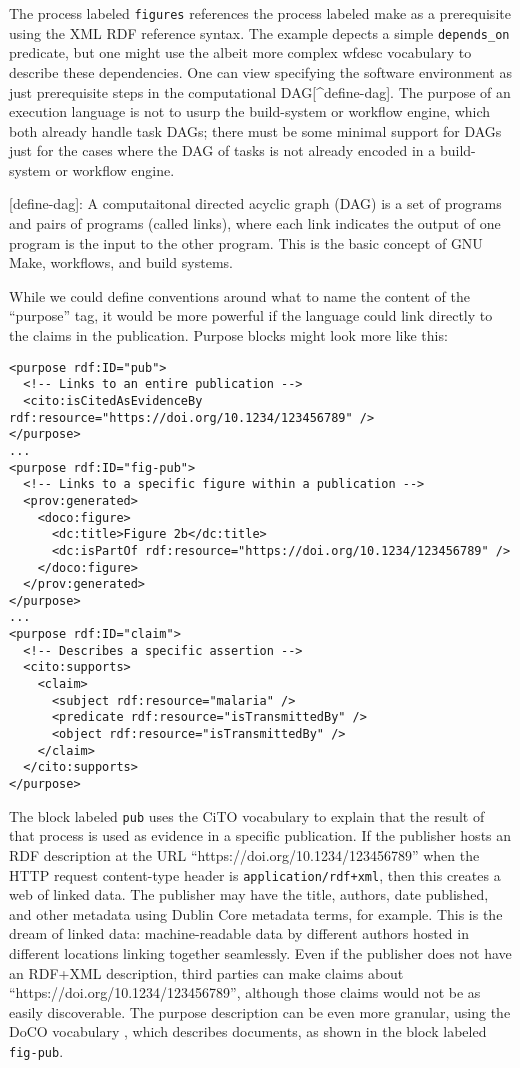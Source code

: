 \documentclass[manuscript,authordraft]{acmart}
\begin{document}
\normalsize

The process labeled \texttt{figures} references the process labeled make
as a prerequisite using the XML RDF reference syntax. The example
depects a simple \texttt{depends\_on} predicate, but one might use the
albeit more complex wfdesc vocabulary to describe these dependencies.
One can view specifying the software environment as just prerequisite
steps in the computational DAG{[}\^{}define-dag{]}. The purpose of an
execution language is not to usurp the build-system or workflow engine,
which both already handle task DAGs; there must be some minimal support
for DAGs just for the cases where the DAG of tasks is not already
encoded in a build-system or workflow engine.

{[}define-dag{]}: A computaitonal directed acyclic graph (DAG) is a set
of programs and pairs of programs (called links), where each link
indicates the output of one program is the input to the other program.
This is the basic concept of GNU Make, workflows, and build systems.

While we could define conventions around what to name the content of the
``purpose'' tag, it would be more powerful if the language could link
directly to the claims in the publication. Purpose blocks might look
more like this:

\small

\begin{verbatim}
<purpose rdf:ID="pub">
  <!-- Links to an entire publication -->
  <cito:isCitedAsEvidenceBy rdf:resource="https://doi.org/10.1234/123456789" />
</purpose>
...
<purpose rdf:ID="fig-pub">
  <!-- Links to a specific figure within a publication -->
  <prov:generated>
    <doco:figure>
      <dc:title>Figure 2b</dc:title>
      <dc:isPartOf rdf:resource="https://doi.org/10.1234/123456789" />
    </doco:figure>
  </prov:generated>
</purpose>
...
<purpose rdf:ID="claim">
  <!-- Describes a specific assertion -->
  <cito:supports>
    <claim>
      <subject rdf:resource="malaria" />
      <predicate rdf:resource="isTransmittedBy" />
      <object rdf:resource="isTransmittedBy" />
    </claim>
  </cito:supports>
</purpose>
\end{verbatim}

\normalsize

The block labeled \texttt{pub} uses the CiTO vocabulary
\cite{shotton_cito_2010} to explain that the result of that process is
used as evidence in a specific publication. If the publisher hosts an
RDF description at the URL ``https://doi.org/10.1234/123456789'' when
the HTTP request content-type header is \texttt{application/rdf+xml},
then this creates a web of linked data. The publisher may have the
title, authors, date published, and other metadata using Dublin Core
metadata terms, for example. This is the dream of linked data:
machine-readable data by different authors hosted in different locations
linking together seamlessly. Even if the publisher does not have an
RDF+XML description, third parties can make claims about
``https://doi.org/10.1234/123456789'', although those claims would not
be as easily discoverable. The purpose description can be even more
granular, using the DoCO vocabulary \cite{constantin_document_2016},
which describes documents, as shown in the block labeled
\texttt{fig-pub}.
\end{document}
